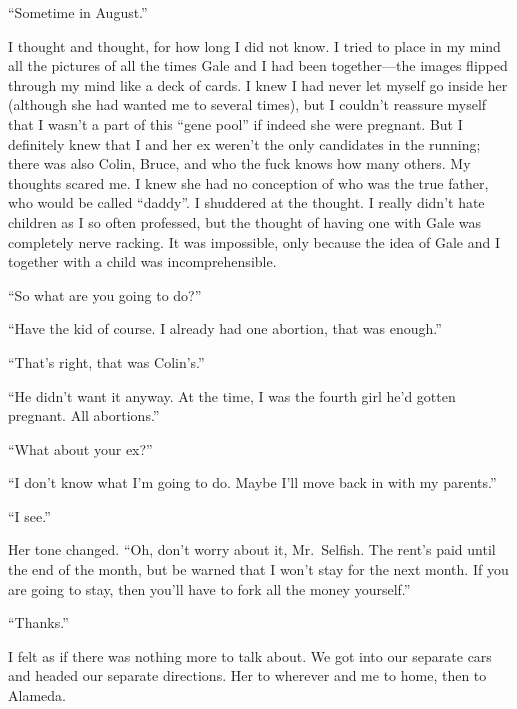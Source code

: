 ``Sometime in August.''

I thought and thought, for how long I did not know. I tried to place in
my mind all the pictures of all the times Gale and I had been
together---the images flipped through my mind like a deck of cards. I
knew I had never let myself go inside her (although she had wanted me to
several times), but I couldn't reassure myself that I wasn't a part of
this ``gene pool'' if indeed she were pregnant. But I definitely knew
that I and her ex weren't the only candidates in the running; there was
also Colin, Bruce, and who the fuck knows how many others. My thoughts
scared me. I knew she had no conception of who was the true father, who
would be called ``daddy''. I shuddered at the thought. I really didn't
hate children as I so often professed, but the thought of having one
with Gale was completely nerve racking. It was impossible, only because
the idea of Gale and I together with a child was incomprehensible.

``So what are you going to do?''

``Have the kid of course. I already had one abortion, that was enough.''

``That's right, that was Colin's.''

``He didn't want it anyway. At the time, I was the fourth girl he'd
gotten pregnant. All abortions.''

``What about your ex?''

``I don't know what I'm going to do. Maybe I'll move back in with my
parents.''

``I see.''

Her tone changed. ``Oh, don't worry about it, Mr.~Selfish. The rent's
paid until the end of the month, but be warned that I won't stay for the
next month. If you are going to stay, then you'll have to fork all the
money yourself.''

``Thanks.''

I felt as if there was nothing more to talk about. We got into our
separate cars and headed our separate directions. Her to wherever and me
to home, then to Alameda.

